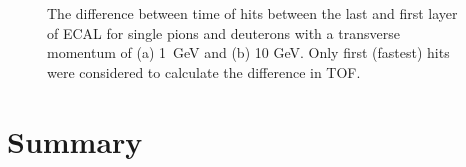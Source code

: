 \documentclass[final,1p,11pt]{elsarticle}
\begin{document}
\begin{figure}
\begin{center}
\end{center}
\caption{The difference between time of hits between the last and first layer of ECAL for single pions and deuterons  with a transverse momentum of (a) 1~GeV  and (b) 10 GeV. 
Only first (fastest) hits were considered to calculate the difference in TOF. }
\label{fig:timediff}
\end{figure}



\clearpage 





%

%


\section{Summary}
\end{document}
